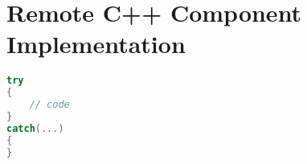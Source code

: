 \section{Remote C++ Component Implementation}
\label{section:LocalC++ComponentImplementation}


\begin{lstlisting}[language=C++]
try
{
    // code
}
catch(...)
{
}
\end{lstlisting}


\newpage